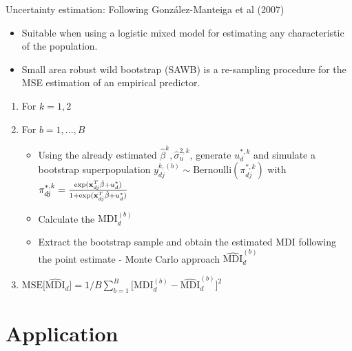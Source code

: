 \documentclass [xcolor=svgnames, t, 9pt] {beamer}
\begin{document}
\begin{frame}{Uncertainty estimation: Following González-Manteiga et al (2007)}

\begin{itemize}
    \item Suitable when using a logistic mixed model for estimating any characteristic
of the population.
\vspace{0.1cm}
\item Small area robust wild bootstrap (SAWB) is a re-sampling procedure for the MSE estimation of an empirical predictor. 

\vspace{0.2cm}
\end{itemize}

\pause

	\begin{enumerate}
		\item
		For $k = 1,2$
		\item
		For $b = 1,...,B$
		\begin{itemize} 
			\item Using the already estimated $\hat{\beta}^k, \hat{\sigma}^{2,k}_u$, generate $u_{d}^{*,k}$ and simulate a bootstrap superpopulation $y^{k,(b)}_{dj}  \sim \text{Bernoulli}({\pi}^{*,k}_{dj})$ with $   {\pi}^{*,k}_{dj} = \frac{\text{exp}(\bold{x}^{T}_{dj}\hat{\beta}+{u}_{d}^{*})} {{1+\text{exp}(\bold{x}^{T}_{dj}\hat{\beta}+{u}_{d}^{*})}}$

			\item Calculate the $\text{MDI}_{d}^{(b)}$ 
			
			\vspace{0.3cm}
			
			\item Extract the bootstrap sample and obtain the estimated MDI following the point estimate - Monte Carlo approach  $\widehat{\text{MDI}}_{d}^{(b)}$
		\end{itemize}
		\vspace{0.2cm}

		\item	
		$
		\text{MSE}\Big[ \widehat{\text{MDI}}_{d} \Big]=1/B \sum\limits_{b=1}^{B}\Big[\text{MDI}_{d}^{(b)}-\widehat{\text{MDI}}_{d}^{(b)}\Big]^2
		$		
	\end{enumerate}

\end{frame}


\section{Application}
\end{document}
